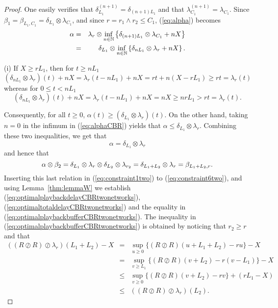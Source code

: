 \begin{proof}
One easily verifies that $\delta_{L_1}^{(n+1)} = \delta_{(n+1)L_1}$ and that $\lambda_{C_1}^{(n+1)} = \lambda_{C_1}$.
Since $\beta_1 = \beta_{L_1,C_1} = \delta_{L_1} \otimes \lambda_{C_1}$,
and since $r = r_1 \wedge r_2 \leq C_1$, (\ref{eq:alpha}) becomes
\begin{eqnarray}
\mylabel{eq:alphaCBR}
\alpha & = & \lambda_r \otimes \inf_{n \in \Nats} \left\{ \delta_{(n+1)L_1} \otimes  \lambda_{C_1} + nX \right\} \nonumber \\
    & = & \delta_{L_1} \otimes \inf_{n \in \Nats} \left\{ \delta_{nL_1} \otimes  \lambda_{r} + nX \right\}.
\end{eqnarray}

\vspace{1ex}
\noindent
(i) %
%
If $X \geq rL_1$, then for $t \geq nL_1$
$$ (\delta_{nL_1} \otimes  \lambda_{r})(t) + nX = \lambda_r (t-nL_1) + nX  = rt + n(X - rL_1) \geq  rt = \lambda_r(t) $$ whereas for $0 \leq t < nL_1$
$$ (\delta_{nL_1} \otimes  \lambda_{r})(t) + nX = \lambda_r (t-nL_1) + nX =  nX \geq nrL_1 > rt = \lambda_r(t). $$

Consequently, for all $t \geq 0$, $\alpha(t) \geq (\delta_{L_1} \otimes \lambda_r)(t)$.
On the other hand, taking $n = 0$ in the infimum in (\ref{eq:alphaCBR}) yields that $\alpha \leq \delta_{L_1} \otimes \lambda_r$. Combining these two inequalities, we get that
$$ \alpha =  \delta_{L_1} \otimes \lambda_r $$
and hence that
\begin{equation}
\mylabel{eq:alphatimesbeta2}
\alpha \otimes \beta_2  =   \delta_{L_1} \otimes \lambda_r \otimes \delta_{L_2} \otimes \lambda_{r_2} =  \delta_{L_1+L_2} \otimes \lambda_r = \beta_{L_1+L_2,r}.
\end{equation}
Inserting this last relation in (\ref{eq:constraint1two}) to (\ref{eq:constraint6two}), and using Lemma~\ref{thm:lemmaW}
we establish (\ref{eq:optimalplaybackdelayCBRtwonetworks}),
(\ref{eq:optimaltotaldelayCBRtwonetworks}) and the equality in (\ref{eq:optimalplaybackbufferCBRtwonetworks}).
The inequality in (\ref{eq:optimalplaybackbufferCBRtwonetworks}) is obtained by noticing that
$r_2 \geq r$ and that
\begin{eqnarray*}
((R \oslash R) \oslash \lambda_{r})(L_1 + L_2) - X
& = & \sup_{u \geq 0} \{ (R \oslash R)(u + L_1 + L_2) - ru \} - X \\
& = & \sup_{v \geq L_1} \{ (R \oslash R)(v + L_2) - r(v-L_1) \} - X \\
& \leq &  \sup_{v \geq 0} \{ (R \oslash R)(v + L_2) - rv \} + (rL_1 - X) \\
& \leq &  ((R \oslash R) \oslash \lambda_{r})(L_2) .
\end{eqnarray*}


\end{proof}
